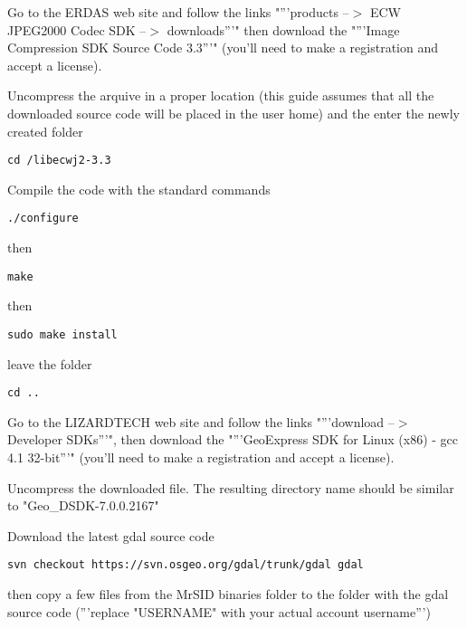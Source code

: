 Go to the ERDAS web site  and follow the links
"'''products --$>$ ECW JPEG2000 Codec SDK --$>$ downloads'''" 
then download the "'''Image Compression SDK Source Code 3.3'''" (you'll need to make a registration 
and accept a license).

Uncompress the arquive in a proper location (this guide assumes 
that all the downloaded source code will be placed in the user home) 
and the enter the newly created folder

\begin{verbatim}
cd /libecwj2-3.3
\end{verbatim}

Compile the code with the standard commands

\begin{verbatim}
./configure
\end{verbatim}

then

\begin{verbatim}
make
\end{verbatim}

then

\begin{verbatim}
sudo make install
\end{verbatim}

leave the folder 

\begin{verbatim}
cd ..
\end{verbatim}

Go to the LIZARDTECH web site  and follow the links
"'''download --$>$ Developer SDKs'''", 
then download the "'''GeoExpress SDK for Linux (x86) - gcc 4.1 32-bit'''"
(you'll need to make a registration and accept a license).

Uncompress the downloaded file. The resulting directory name should be similar to "Geo\_DSDK-7.0.0.2167"

Download the latest gdal source code

\begin{verbatim}
svn checkout https://svn.osgeo.org/gdal/trunk/gdal gdal
\end{verbatim}

then copy a few files from the MrSID binaries folder to the folder with the gdal source code
('''replace "USERNAME" with your actual account username''')

